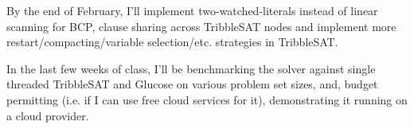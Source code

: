 \documentclass[10pt]{article}
\begin{document}
  By the end of February, I'll implement two-watched-literals instead of linear scanning for BCP, clause sharing across 
  TribbleSAT nodes and implement more restart/compacting/variable selection/etc. strategies in TribbleSAT.

  In the last few weeks of class, I'll be benchmarking the solver against single threaded TribbleSAT and Glucose on various
  problem set sizes, and, budget permitting (i.e. if I can use free cloud services for it), demonstrating it running on a
  cloud provider.
\end{document}
